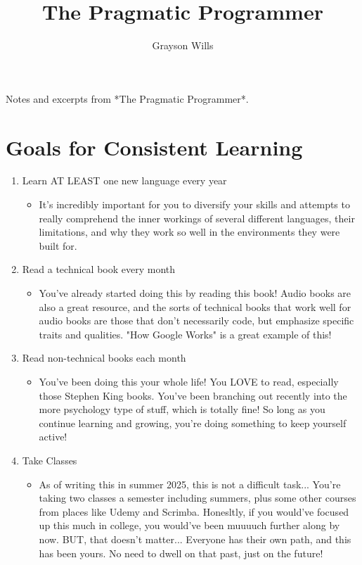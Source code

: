 \documentclass{article}
\title{The Pragmatic Programmer}
\author{Grayson Wills}
\begin{document}
\maketitle
Notes and excerpts from *The Pragmatic Programmer*.

\section*{Goals for Consistent Learning}
\begin{enumerate}
    \item Learn AT LEAST one new language every year
        \begin{itemize}
            \item It's incredibly important for you to diversify your skills and attempts to really comprehend the inner workings of several different languages, their limitations, and why they work so well in the environments they were built for.
        \end{itemize}
    \item Read a technical book every month
        \begin{itemize}
            \item You've already started doing this by reading this book! Audio books are also a great resource, and the sorts of technical books that work well for audio books are those that don't necessarily code, but emphasize specific traits and qualities. "How Google Works" is a great example of this!
        \end{itemize}
    \item Read non-technical books each month
        \begin{itemize}
            \item You've been doing this your whole life! You LOVE to read, especially those Stephen King books. You've been branching out recently into the more psychology type of stuff, which is totally fine! So long as you continue learning and growing, you're doing something to keep yourself active!
        \end{itemize}
    \item Take Classes
        \begin{itemize}
            \item As of writing this in summer 2025, this is not a difficult task... You're taking two classes a semester including summers, plus some other courses from places like Udemy and Scrimba. Honesltly, if you would've focused up this much in college, you would've been muuuuch further along by now. BUT, that doesn't matter... Everyone has their own path, and this has been yours. No need to dwell on that past, just on the future!

\end{itemize}
\end{enumerate}
\end{document}

